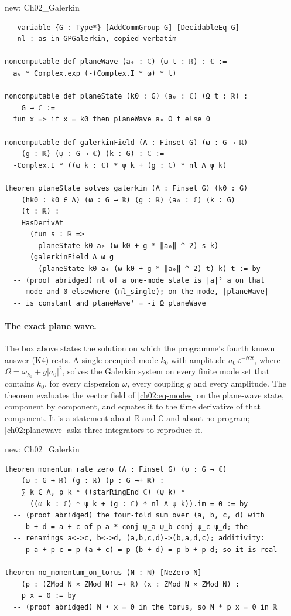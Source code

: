 \begin{leanbox}{new: Ch02\_Galerkin}
\begin{lstlisting}[style=lean]
-- variable {G : Type*} [AddCommGroup G] [DecidableEq G]
-- nl : as in GPGalerkin, copied verbatim

noncomputable def planeWave (a₀ : ℂ) (ω t : ℝ) : ℂ :=
  a₀ * Complex.exp (-(Complex.I * ω) * t)

noncomputable def planeState (k0 : G) (a₀ : ℂ) (Ω t : ℝ) :
    G → ℂ :=
  fun x => if x = k0 then planeWave a₀ Ω t else 0

noncomputable def galerkinField (Λ : Finset G) (ω : G → ℝ)
    (g : ℝ) (ψ : G → ℂ) (k : G) : ℂ :=
  -Complex.I * ((ω k : ℂ) * ψ k + (g : ℂ) * nl Λ ψ k)

theorem planeState_solves_galerkin (Λ : Finset G) (k0 : G)
    (hk0 : k0 ∈ Λ) (ω : G → ℝ) (g : ℝ) (a₀ : ℂ) (k : G)
    (t : ℝ) :
    HasDerivAt
      (fun s : ℝ =>
        planeState k0 a₀ (ω k0 + g * ‖a₀‖ ^ 2) s k)
      (galerkinField Λ ω g
        (planeState k0 a₀ (ω k0 + g * ‖a₀‖ ^ 2) t) k) t := by
  -- (proof abridged) nl of a one-mode state is |a|² a on that
  -- mode and 0 elsewhere (nl_single); on the mode, |planeWave|
  -- is constant and planeWave' = -i Ω planeWave
\end{lstlisting}
\end{leanbox}

\paragraph{The exact plane wave.} The box above states the solution on which the programme's fourth known answer (K4) rests.
A single occupied mode $k_0$ with amplitude $a_0\,\ee^{-\ii\Omega t}$, where $\Omega=\omega_{k_0}+g|a_0|^2$, solves the Galerkin system on every finite mode set that contains $k_0$, for
every dispersion $\omega$, every coupling $g$ and every amplitude. The theorem evaluates the vector field of \cref{ch02:eq-modes} on the plane-wave state, component by component, and equates it
to the time derivative of that component. It is a statement about $\mathbb R$ and $\mathbb C$ and about no program; \cref{ch02:planewave} asks three integrators to reproduce it.

\begin{leanbox}{new: Ch02\_Galerkin}
\begin{lstlisting}[style=lean]
theorem momentum_rate_zero (Λ : Finset G) (ψ : G → ℂ)
    (ω : G → ℝ) (g : ℝ) (p : G →+ ℝ) :
    ∑ k ∈ Λ, p k * ((starRingEnd ℂ) (ψ k) *
      ((ω k : ℂ) * ψ k + (g : ℂ) * nl Λ ψ k)).im = 0 := by
  -- (proof abridged) the four-fold sum over (a, b, c, d) with
  -- b + d = a + c of p a * conj ψ_a ψ_b conj ψ_c ψ_d; the
  -- renamings a<->c, b<->d, (a,b,c,d)->(b,a,d,c); additivity:
  -- p a + p c = p (a + c) = p (b + d) = p b + p d; so it is real

theorem no_momentum_on_torus (N : ℕ) [NeZero N]
    (p : (ZMod N × ZMod N) →+ ℝ) (x : ZMod N × ZMod N) :
    p x = 0 := by
  -- (proof abridged) N • x = 0 in the torus, so N * p x = 0 in ℝ
\end{lstlisting}
\end{leanbox}

